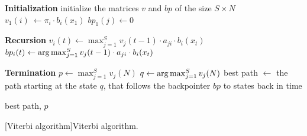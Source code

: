 \begin{algorithm}[ht!]
\begin{algorithmic}[1]

\Statex \textbf{Initialization}
\State initialize the matrices $v$ and $bp$ of the size $S\times N$
	\State $v_1(i)\ \gets \pi_i\cdot b_i(x_1)$
	\State $bp_1(j)\gets 0$
\EndFor

\Statex \textbf{Recursion}
		\State $v_i(t) \gets \max_{j=1}^S v_{j}(t-1)\cdot a_{ji}\cdot b_i(x_t)$
		\State $bp_i(t) \gets \argmax_{j=1}^S v_j(t-1)\cdot a_{ji}\cdot b_i(x_t)$
	\EndFor
\EndFor

\Statex \textbf{Termination}
\State $p \gets \max_{j=1}^S v_j(N)$ 
\State $q \gets \argmax_{j=1}^S v_j(N)$ 
\State best path $\gets$ the path starting at the state $q$, that follows the backpointer $bp$ to states back in time

    \State \Return best path, $p$
\end{algorithmic}
[Viterbi algorithm]{Viterbi algorithm.}
\end{algorithm}
